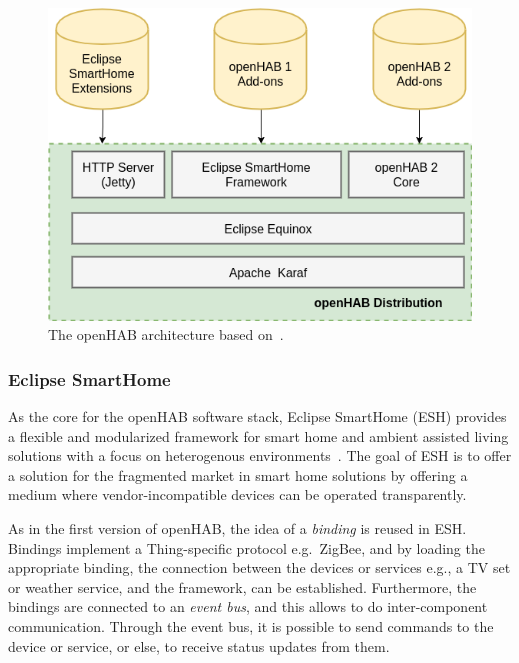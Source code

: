 \documentclass[12pt]{article}
\begin{document}
\begin{figure} [ht] 
\begin{center}
\includegraphics[width=\textwidth]{oh_architecture}
\caption{The openHAB architecture based on~\cite{openhab_02}.}
\label{fig:oh_architecture}
\end{center}
\end{figure}

\subsubsection{Eclipse SmartHome}

As the core for the openHAB software stack, Eclipse SmartHome (ESH) provides a flexible and modularized framework for smart home and ambient assisted living solutions with a focus on heterogenous environments~\cite{esh_01}. The goal of ESH is to offer a solution for the fragmented market in smart home solutions by offering a medium where vendor-incompatible devices can be operated transparently.

As in the first version of openHAB, the idea of a \emph{binding} is reused in ESH. Bindings implement a Thing-specific protocol e.g.\ ZigBee, and by loading the appropriate binding, the connection between the devices or services e.g., a TV set or weather service, and the framework, can be established. Furthermore, the bindings are connected to an \emph{event bus}, and this allows to do inter-component communication. Through the event bus, it is possible to send commands to the device or service, or else, to receive status updates from them.
\end{document}

